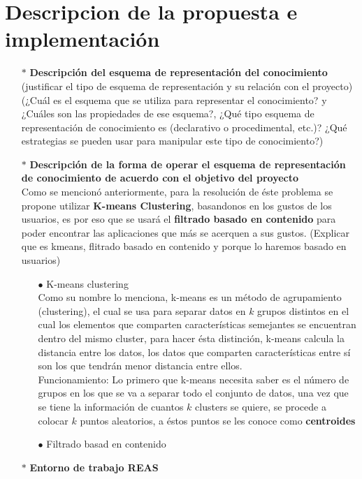 \documentclass[10pt, a4paper]{article}
\begin{document}
\section{Descripcion de la propuesta e implementaci\'on}
\begin{enumerate}
\item[$\ast$]\textbf{Descripci\'on del esquema de representaci\'on del conocimiento} (justificar el tipo de esquema de representaci\'on y su relaci\'on con el proyecto) (¿Cuál es el esquema que se utiliza para representar el conocimiento? y ¿Cuáles son las propiedades de ese esquema?, ¿Qué tipo esquema de representación de conocimiento es (declarativo o procedimental, etc.)? ¿Qué estrategias se pueden usar para manipular este tipo de conocimiento?)
\item[$\ast$]\textbf{Descripci\'on de la forma de operar el esquema de representaci\'on de conocimiento de acuerdo con el objetivo del proyecto}\\
Como se mencion\'o anteriormente, para la resoluci\'on de \'este problema se propone utilizar \textbf{K-means Clustering}, basandonos en los gustos de los usuarios, es por eso que se usar\'a el \textbf{filtrado basado en contenido} para poder encontrar las aplicaciones que m\'as se acerquen a sus gustos. (Explicar que es kmeans, flitrado basado en contenido y porque lo haremos basado en usuarios)
\begin{enumerate}
\item[$\bullet$]K-means clustering \\
Como su nombre lo menciona, k-means es un m\'etodo de agrupamiento (clustering), el cual se usa para separar datos en $k$ grupos distintos en el cual los elementos que comparten caracter\'isticas semejantes se encuentran dentro del mismo cluster, para hacer \'esta distinci\'on, k-means calcula la distancia entre los datos, los datos que comparten caracter\'isticas entre s\'i son los que tendr\'an menor distancia entre ellos.\\
Funcionamiento: Lo primero que k-means necesita saber es el n\'umero de grupos en los que se va a separar todo el conjunto de datos, una vez que se tiene la informaci\'on de cuantos $k$ clusters se quiere, se procede a colocar $k$ puntos aleatorios, a \'estos puntos se les conoce como \textbf{centroides}  
\item[$\bullet$]Filtrado basad en contenido
\end{enumerate}
\item[$\ast$]\textbf{Entorno de trabajo REAS}
\begin{enumerate}

\end{enumerate}
\end{enumerate}
\end{document}
